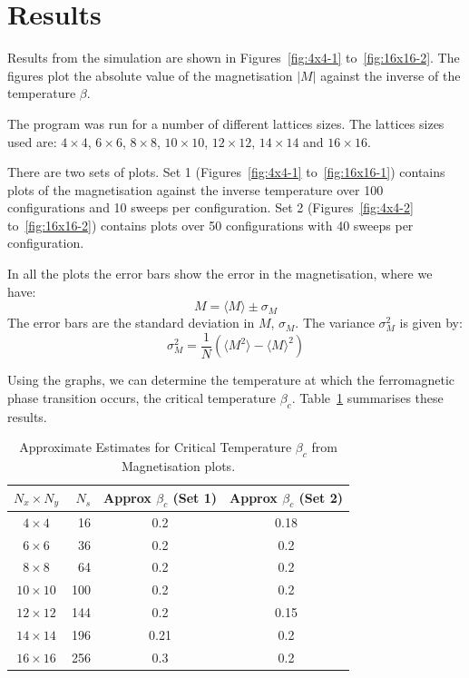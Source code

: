 \documentclass[a4paper]{IEEEtran}
\newcommand{\av}[1]{\langle #1 \rangle}
\begin{document}

\section{Results}

    Results from the simulation are shown in Figures~\ref{fig:4x4-1} 
    to~\ref{fig:16x16-2}. 
    The figures plot the absolute value of the 
    magnetisation $|M|$ against the inverse of the
    temperature $\beta$.

    The program was run for a number of different lattices sizes.
    The lattices sizes used are: $4 \times 4$, 
    $6 \times 6$, $8 \times 8$, $10 \times 10$, $12 \times 12$,
    $14 \times 14$ and $16 \times 16$.

    There are two sets of plots. 
    Set 1 (Figures~\ref{fig:4x4-1} to~\ref{fig:16x16-1})
    contains plots of the magnetisation
    against the inverse temperature over 100 configurations
    and 10 sweeps per configuration. 
    Set 2 (Figures~\ref{fig:4x4-2} to~\ref{fig:16x16-2})
    contains plots over 50
    configurations with 40 sweeps per configuration.

    In all the plots the error bars show the error in the magnetisation,
    where we have:
    \[ M = \av{M} \pm \sigma_M \]
    The error bars are the standard deviation in $M$, $\sigma_M$. 
    The variance $\sigma_{M}^2$ is given by:
    \[ \sigma_{M}^2 = \frac{1}{N} \left( \av{M^2} - \av{M}^2 \right) \]

    Using the graphs, we can determine the temperature at which
    the ferromagnetic phase transition occurs, the critical temperature $\beta_c$.
    Table~\ref{tbl:betac} summarises these results.

    \begin{table}[ht]
        \begin{center} 
        \caption{Approximate Estimates for Critical Temperature
                 $\beta_c$ from Magnetisation plots.}
        \label{tbl:betac} 

        \begin{tabular}{c|r|cc} \hline
        $N_x \times N_y$ & $N_s$ & Approx $\beta_c$ (Set 1)
                                 & Approx $\beta_c$ (Set 2) \\ \hline
        $4 \times 4$   & 16  & 0.2 & 0.18 \\ 
        $6 \times 6$   & 36  & 0.2 & 0.2  \\ 
        $8 \times 8$   & 64  & 0.2 & 0.2  \\ 
        $10 \times 10$ & 100 & 0.2 & 0.2  \\ 
        $12 \times 12$ & 144 & 0.2 & 0.15 \\ 
        $14 \times 14$ & 196 & 0.21 & 0.2 \\ 
        $16 \times 16$ & 256 & 0.3 & 0.2  \\ \hline
        \end{tabular}
        \end{center} 
    \end{table} 
\end{document}

